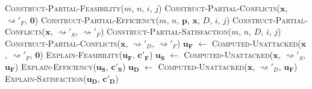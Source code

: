 \begin{algorithm}[H]
	\caption{}
	\begin{algorithmic}[1]
				\State \Return \textsc{Construct-Partial-Feasibility}($m$, $n$, $i$, $j$)
			\EndFunction
				\State \Return \textsc{Construct-Partial-Conflicts}($\mathbf{x}$, $\rightsquigarrow'_F$, $\mathbf{0}$)
			\EndFunction
				\State \Return \textsc{Construct-Partial-Efficiency}($m$, $n$, $\mathbf{p}$, $\mathbf{x}$, $D$, $i$, $j$)
			\EndFunction
				\State \Return \textsc{Construct-Partial-Conflicts}($\mathbf{x}$, $\rightsquigarrow'_S$, $\rightsquigarrow'_F$)
			\EndFunction
				\State \Return \textsc{Construct-Partial-Satisfaction}($m$, $n$, $D$, $i$, $j$)
			\EndFunction
				\State \Return \textsc{Construct-Partial-Conflicts}($\mathbf{x}$, $\rightsquigarrow'_D$, $\rightsquigarrow'_F$)
			\EndFunction
			\State $\mathbf{u_F}$ $\gets$ \textsc{Computed-Unattacked}($\mathbf{x}$, $\rightsquigarrow'_F$, $\mathbf{0}$)
			\State \textsc{Explain-Feasibility}($\mathbf{u_F}$, $\mathbf{c'_F}$)
			\State $\mathbf{u_S}$ $\gets$ \textsc{Computed-Unattacked}($\mathbf{x}$, $\rightsquigarrow'_S$, $\mathbf{u_F}$)
			\State \textsc{Explain-Efficiency}($\mathbf{u_S}$, $\mathbf{c'_S}$)
			\State $\mathbf{u_D}$ $\gets$ \textsc{Computed-Unattacked}($\mathbf{x}$, $\rightsquigarrow'_D$, $\mathbf{u_F}$)
			\State \textsc{Explain-Satisfaction}($\mathbf{u_D}$, $\mathbf{c'_D}$)
		\EndFunction
	\end{algorithmic}
\end{algorithm}





